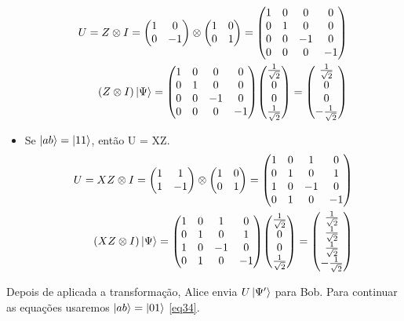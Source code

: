 \documentclass[a4paper, 12pt, oneside]{book}
\begin{document}
\begin{itemize}
\begin{align*}
U = Z\otimes I = \mqty(1&0\\0&-1)\otimes\mqty(1&0\\0&1) = 
	\mqty(1&0&0&0\\0&1&0&0\\0&0&-1&0\\0&0&0&-1) \\
(Z\otimes I)\ket{\Psi} =  \mqty(1&0&0&0\\0&1&0&0\\0&0&-1&0\\0&0&0&-1) 
	\mqty(\frac{1}{\sqrt{2}}\\0\\ 0\\ \frac{1}{\sqrt{2}}) 
	= \mqty(\frac{1}{\sqrt{2}}\\0\\ 0\\ -\frac{1}{\sqrt{2}}) 
\end{align*}
\item Se $\ket{ab}=\ket{11}$, então U = XZ.
\begin{align*}
U = XZ\otimes I = \mqty(1&1\\1&-1)\otimes\mqty(1&0\\0&1) = 
	\mqty(1&0&1&0\\0&1&0&1\\1&0&-1&0\\0&1&0&-1) \\
(XZ\otimes I)\ket{\Psi} =  \mqty(1&0&1&0\\0&1&0&1\\1&0&-1&0\\0&1&0&-1)
	\mqty(\frac{1}{\sqrt{2}}\\0\\ 0\\ \frac{1}{\sqrt{2}}) 
	= \mqty(\frac{1}{\sqrt{2}}\\ \frac{1}{\sqrt{2}}\\ \frac{1}{\sqrt{2}}\\ -\frac{1}{\sqrt{2}}) 
\end{align*}
\end{itemize}
Depois de aplicada a transformação, Alice envia $U\ket{\Psi'}$ para Bob. Para continuar as equações usaremos $\ket{ab}=\ket{01}$ \eqref{eq34}.
\end{document}
